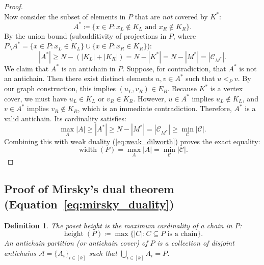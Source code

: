 \documentclass[11pt, letterpaper]{article}
\newtheorem{definition}{Definition}[section]
\begin{document}
\begin{proof}
\begin{equation}
\end{equation}
Now consider the subset of elements in $P$ that are \emph{not} covered by $K^*$:
\begin{equation}
    A^* \coloneqq \{x \in P : x_L \notin K_L \text{ and } x_R \notin K_R\}.
\end{equation}
By the union bound (subadditivity of projections in $P$, where $P \setminus A^* = \{x \in P : x_L \in K_L\} \cup \{x \in P : x_R \in K_R\}$):
\begin{equation}
    |A^*| \ge N - (|K_L| + |K_R|) = N - |K^*| = N - |M^*| = |\mathcal{C}_{M^*}|.
\end{equation}
We claim that $A^*$ is an antichain in $P$. 
Suppose, for contradiction, that $A^*$ is not an antichain. Then there exist distinct elements $u, v \in A^*$ such that $u <_P v$. 
By our graph construction, this implies $(u_L, v_R) \in E_B$. 
Because $K^*$ is a vertex cover, we must have $u_L \in K_L$ or $v_R \in K_R$. 
However, $u \in A^*$ implies $u_L \notin K_L$, and $v \in A^*$ implies $v_R \notin K_R$, which is an immediate contradiction. 
Therefore, $A^*$ is a valid antichain. Its cardinality satisfies:
\begin{equation}
    \max_A |A| \ge |A^*| \ge N - |M^*| = |\mathcal{C}_{M^*}| \ge \min_{\mathcal{C}} |\mathcal{C}|.
\end{equation}
Combining this with weak duality (\ref{eq:weak_dilworth}) proves the exact equality:
\begin{equation}
    \operatorname{width}(P) = \max_A |A| = \min_{\mathcal{C}} |\mathcal{C}|.
\end{equation}
\end{proof}

\subsection{Proof of Mirsky's dual theorem (\texorpdfstring{Equation~\ref{eq:mirsky_duality}}{Eq. 2})}
\begin{definition}
The \emph{poset height} is the maximum cardinality of a chain in $P$:
\begin{equation}
    \operatorname{height}(P) \coloneqq \max \{|C| : C \subseteq P \text{ is a chain}\}.
\end{equation}
An \emph{antichain partition} (or antichain cover) of $P$ is a collection of disjoint antichains $\mathcal{A} = \{A_i\}_{i \in [k]}$ such that $\bigcup_{i \in [k]} A_i = P$.
\end{definition}
\end{document}
